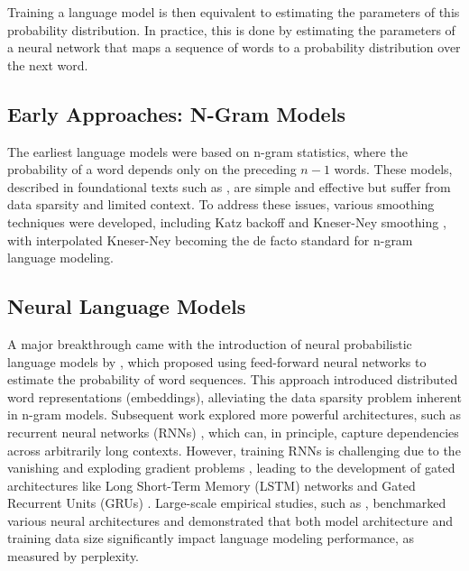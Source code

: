 Training a language model is then equivalent to estimating the parameters of this probability distribution. In practice, this is done by estimating the parameters of a neural network that maps a sequence of words to a probability distribution over the next word. 

\subsection{Early Approaches: N-Gram Models}
The earliest language models were based on n-gram statistics, where the probability of a word depends only on the preceding $n-1$ words. These models, described in foundational texts such as \cite{jurafsky2025speech}, are simple and effective but suffer from data sparsity and limited context. To address these issues, various smoothing techniques were developed, including Katz backoff \citep{katz2003estimation} and Kneser-Ney smoothing \citep{kneser1995improved}, with interpolated Kneser-Ney \citep{chen1999empirical} becoming the de facto standard for n-gram language modeling.

\subsection{Neural Language Models}

A major breakthrough came with the introduction of neural probabilistic language models by \cite{bengio2003neural}, which proposed using feed-forward neural networks to estimate the probability of word sequences. This approach introduced distributed word representations (embeddings), alleviating the data sparsity problem inherent in n-gram models. Subsequent work explored more powerful architectures, such as recurrent neural networks (RNNs) \citep{mikolov2010recurrent}, which can, in principle, capture dependencies across arbitrarily long contexts. However, training RNNs is challenging due to the vanishing and exploding gradient problems \citep{bengio1994learning}, leading to the development of gated architectures like Long Short-Term Memory (LSTM) networks \citep{hochreiter1997lstm} and Gated Recurrent Units (GRUs) \citep{cho2014gru}.
Large-scale empirical studies, such as \cite{jozefowicz2016exploring}, benchmarked various neural architectures and demonstrated that both model architecture and training data size significantly impact language modeling performance, as measured by perplexity.
